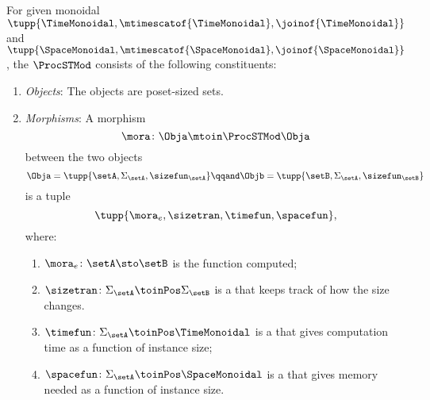 \begin{definition}
    \label{def:ProcSTMod}
    For given monoidal ~$\tupp{\TimeMonoidal, \mtimescatof{\TimeMonoidal}, \joinof{\TimeMonoidal}}$ and~$\tupp{\SpaceMonoidal, \mtimescatof{\SpaceMonoidal}, \joinof{\SpaceMonoidal}}$, the  $\ProcSTMod$ consists of the following constituents:
    \begin{enumerate}
        \item \emph{Objects}: The objects are poset-sized sets.
        \item \emph{Morphisms}: A morphism
              \begin{equation}
                  \mora \colon \Obja \mtoin\ProcSTMod \Obja
              \end{equation}
              between the two objects
              \begin{equation}
                  \Obja = \tupp{\setA, \Sigma_{\setA}, \sizefun_{\setA}}
                  \qqand
                  \Objb = \tupp{\setB, \Sigma_{\setA}, \sizefun_{\setB}}
              \end{equation}
              is a tuple
              \begin{equation}
                  \tupp{\mora_e, \sizetran, \timefun, \spacefun },
              \end{equation}
              where:
              \begin{enumerate}
                  \item $\mora_e \colon \setA \sto \setB$ is the function computed;
                  \item $\sizetran\colon \Sigma_{\setA} \toinPos \Sigma_{\setB}$ is a  that keeps track of how the size changes.
                  \item $\timefun\colon \Sigma_{\setA} \toinPos \TimeMonoidal$ is a  that gives computation time as a function of instance size;
                  \item $\spacefun\colon \Sigma_{\setA} \toinPos \SpaceMonoidal$ is a  that gives memory needed as a function of instance size.
              \end{enumerate}


\end{enumerate}
\end{definition}
